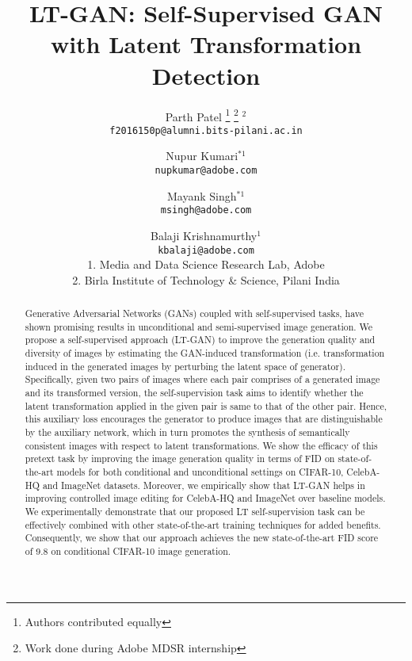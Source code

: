 \documentclass[10pt,twocolumn,letterpaper]{article}
\begin{document}
\title{LT-GAN: Self-Supervised GAN with Latent Transformation Detection}
\author{Parth Patel \thanks{Authors contributed equally}  \thanks{Work done during Adobe MDSR internship}  $^{2}$ \\
{\tt\small f2016150p@alumni.bits-pilani.ac.in}
\and
Nupur Kumari$^{*1}$ \\
{\tt\small nupkumar@adobe.com}
\and
Mayank Singh$^{*1}$ \\
{\tt\small msingh@adobe.com}
\and
Balaji Krishnamurthy$^{1}$ \\
{\tt\small kbalaji@adobe.com} \\
1. Media and Data Science Research Lab, Adobe \\
2. Birla Institute of Technology \& Science, Pilani India 
}
\maketitle
\ifwacvfinal\thispagestyle{empty}\fi

\maketitle


\begin{abstract}
Generative Adversarial Networks (GANs) coupled with self-supervised tasks, have shown promising results in unconditional and semi-supervised image generation. We propose a self-supervised approach (LT-GAN) to improve the generation quality and diversity of images by estimating the GAN-induced transformation (i.e. transformation induced in the generated images by perturbing the latent space of generator). Specifically, given two pairs of images where each pair comprises of a generated image and its transformed version, the self-supervision task aims to identify whether the latent transformation applied in the given pair is same to that of the other pair. Hence, this auxiliary loss encourages the generator to produce images that are distinguishable by the auxiliary network, which in turn promotes the synthesis of semantically consistent images with respect to latent transformations. We show the efficacy of this pretext task by improving the image generation quality in terms of FID on state-of-the-art models for both conditional and unconditional settings on CIFAR-10, CelebA-HQ and ImageNet datasets. Moreover, we empirically show that LT-GAN helps in improving controlled image editing for CelebA-HQ and ImageNet over baseline models. We experimentally demonstrate that our proposed LT self-supervision task can be effectively combined with other state-of-the-art training techniques for added benefits. Consequently, we show that our approach achieves the new state-of-the-art FID score of 9.8 on conditional CIFAR-10 image generation.






\end{abstract}
\end{document}
